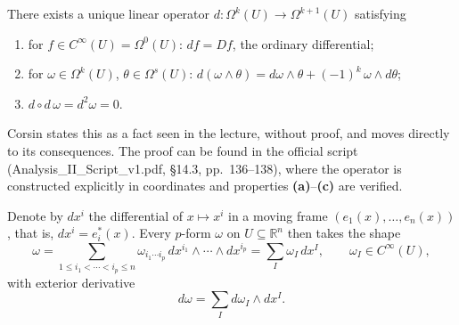 \begin{theorem}
\label{thm:exterior_derivative}
There exists a unique linear operator $d : \Omega^k(U) \to \Omega^{k+1}(U)$ satisfying
\begin{enumerate}[label=\textbf{(\alph*)}]
  \item for $f \in C^\infty(U) = \Omega^0(U)$: $df = Df$, the ordinary differential;
  \item for $\omega \in \Omega^k(U)$, $\theta \in \Omega^s(U)$: $d(\omega\wedge\theta) =
  d\omega\wedge\theta + (-1)^k\,\omega\wedge d\theta$;
  \item $d\circ d\,\omega = d^2\omega = 0$.
\end{enumerate}
\end{theorem}

\begin{ainote}
Corsin states this as a fact seen in the lecture, without proof, and moves directly to its
consequences. The proof can be found in the official script
(Analysis\_II\_Script\_v1.pdf, §14.3, pp.\ 136--138), where the operator is constructed
explicitly in coordinates and properties \textbf{(a)}--\textbf{(c)} are verified.
\end{ainote}

Denote by $dx^i$ the differential of $x \mapsto x^i$ in a moving frame $(e_1(x),\ldots,e_n(x))$,
that is, $dx^i = e_i^*(x)$. Every $p$-form $\omega$ on $U \subseteq \mathbb{R}^n$ then takes
the shape
\[\omega = \sum_{1\leq i_1<\cdots<i_p\leq n} \omega_{i_1\cdots i_p}\,dx^{i_1}\wedge\cdots\wedge
  dx^{i_p} = \sum_I \omega_I\,dx^I, \qquad \omega_I \in C^\infty(U),\]
with exterior derivative
\[d\omega = \sum_I d\omega_I \wedge dx^I.\]

